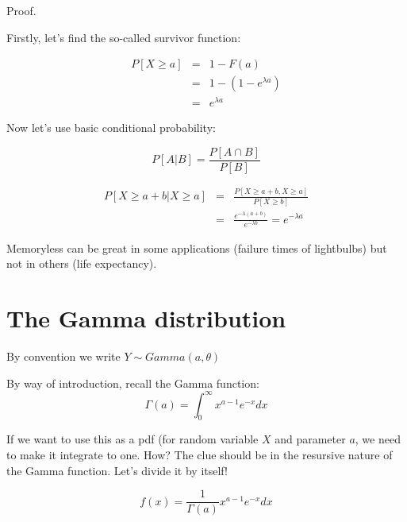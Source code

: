 \documentclass[12pt]{extbook}
\begin{document}
Proof.

Firstly, let's find the so-called survivor function:

\begin{eqnarray*}
P[X \geq a] &=& 1-F(a)\\ 
&=& 1 - (1-e^{\lambda a}) \\
&=& e^{\lambda a}
\end{eqnarray*}


Now let's use basic conditional probability:

\begin{displaymath}
P[A|B] = \frac{P[A \cap B]}{P[B]}
\end{displaymath}


\begin{eqnarray*}
P[X \geq a+b | X \geq a] &=& \frac{P[X \geq a+b, X \geq a]}{P[X \geq b]}\\
&=& \frac{e^{-\lambda(a+b)}}{e^{-\lambda b}} = e^{-\lambda a}
\end{eqnarray*}





Memoryless can be great in some applications (failure times of lightbulbs) but not in others (life expectancy).




\section{The Gamma distribution}

{\color{green} By convention we write $Y \sim Gamma(a,\theta)$}

By way of introduction, recall the Gamma function:
\begin{displaymath}
\Gamma (a) = \int_0^{\infty} x^{a-1} e^{-x} dx
\end{displaymath}

If we want to use this as a pdf (for random variable $X$ and parameter $a$, we need to make it integrate to one.   How?   The clue should be in the resursive nature of the Gamma function.   Let's divide it by itself!

\begin{displaymath}
f(x) = \frac{1}{\Gamma (a)} x^{a-1} e^{-x} dx
\end{displaymath}
\end{document}
